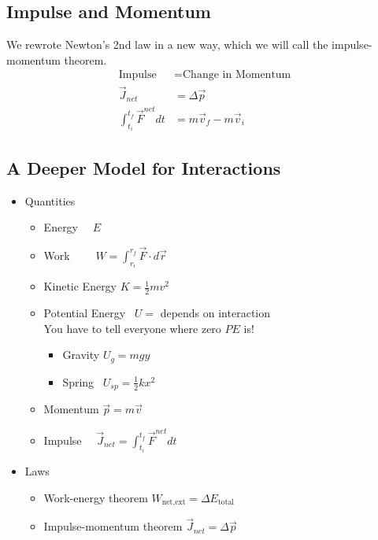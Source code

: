 \documentclass[]{article}
\begin{document}
\begin{PresentSpace}
\vspace{-10pt}
\section*{Impulse and Momentum}
\vspace{-5pt}
We rewrote Newton's 2nd law in a new way, which we will call the impulse-momentum theorem.
\begin{align*}
	\text{Impulse} & = \text{Change in Momentum} \\
	\vec{J}_{net} & = \Delta\vec{p} \\
	\int_{t_{i}}^{t_{f}}\vec{F}^{net}dt & = m\vec{v}_{f}-m\vec{v}_{i}
\end{align*}
\end{PresentSpace}
\newpage
\begin{TeacherMargin}

\end{TeacherMargin}
\begin{PresentSpace}
\vspace{-10pt}
\section*{A Deeper Model for Interactions}
\vspace{-10pt}
\begin{itemize}
	\item Quantities
	\begin{itemize}
		\item Energy \qquad \qquad \qquad \quad \ \ $E$
		\item Work \qquad \qquad \qquad \quad \ \ \ \ $W = \int_{r_{i}}^{r_{f}}\vec{F}\cdot d\vec{r}$
		\item Kinetic Energy \qquad \qquad $K=\frac{1}{2}mv^{2}$
		\item Potential Energy \qquad \quad \ $U=$ depends on interaction \\
		You have to tell everyone where zero $PE$ is!
		\begin{itemize}
			\item Gravity \qquad $U_{g} = mgy$
			\item Spring \qquad \ $U_{sp} = \frac{1}{2}kx^{2}$
		\end{itemize}
		\item Momentum \qquad \qquad \qquad $\vec{p}=m\vec{v}$
		\item Impulse \qquad \qquad \quad \quad \ \ $\vec{J}_{net}=\int_{t_{i}}^{t_{f}}\vec{F}^{net}dt$
	\end{itemize}
	\item Laws
	\begin{itemize}
		\item Work-energy theorem \qquad $W_{\text{net,ext}} = \Delta E_{\text{total}}$
		\item Impulse-momentum theorem \qquad $\vec{J}_{net} = \Delta\vec{p}$
	\end{itemize}
\end{itemize}
\end{PresentSpace}
\end{document}
